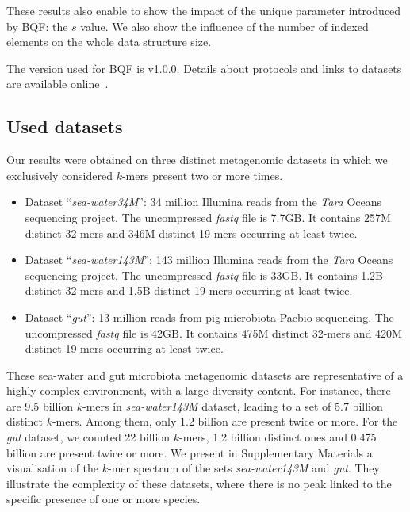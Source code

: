 These results also enable to show the impact of the unique parameter introduced by BQF: the $s$ value. We also show the influence of the number of indexed elements on the whole data structure size.


The version used for BQF is v1.0.0. Details about protocols and links to datasets are available online~\cite{protocols}.

\subsection{Used datasets} \label{ssec:setup}

Our results were obtained on three distinct metagenomic datasets in which we exclusively considered $k$-mers present two or more times. 

\begin{itemize}
    \item Dataset ``\textit{sea-water34M}'': 34 million Illumina reads from the \textit{Tara} Oceans sequencing project. The uncompressed \textit{fastq} file is  7.7GB. It contains 257M distinct 32-mers and 346M distinct 19-mers occurring at least twice.
    \item Dataset ``\textit{sea-water143M}'': 143 million Illumina reads from the \textit{Tara} Oceans sequencing project. The uncompressed \textit{fastq} file is  33GB. It contains 1.2B distinct 32-mers and 1.5B distinct 19-mers occurring at least twice.
    \item Dataset ``\textit{gut}'': 13 million reads from pig microbiota Pacbio sequencing. The uncompressed \textit{fastq} file is 42GB.  It contains 475M distinct 32-mers and 420M distinct 19-mers occurring at least twice.
\end{itemize}  

These sea-water and gut microbiota metagenomic datasets are representative of a highly complex environment, with a large diversity content. For instance, there are 9.5 billion $k$-mers in \textit{sea-water143M} dataset, leading to a set of 5.7 billion distinct $k$-mers. Among them, only 1.2 billion are present twice or more. For the \textit{gut} dataset, we counted 22 billion $k$-mers, 1.2 billion distinct ones and 0.475 billion are present twice or more. We present in Supplementary Materials a visualisation of the $k$-mer spectrum of the sets \textit{sea-water143M} and \textit{gut}. They illustrate the complexity of these datasets, where there is no peak linked to the specific presence of one or more species. %


